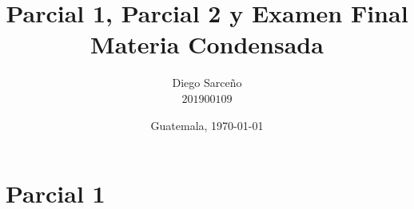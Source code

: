 





\title{\sc Parcial 1, Parcial 2 y Examen Final \\ \footnotesize{Materia Condensada}}%
\author{Diego Sarceño \\ $201900109$}
\date{Guatemala, \today}

  
\maketitle



\section{Parcial 1}
\label{sec:parcial1}
	
